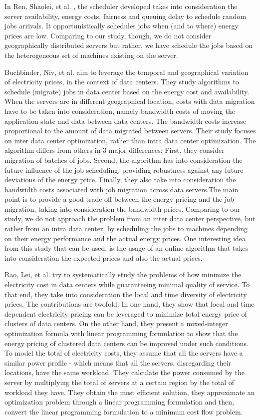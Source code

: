 In Ren, Shaolei, et al. \cite{EFF_JOB_SCHEDULING}, the scheduler developed takes into consideration
the server availability, energy costs, fairness and queuing delay to schedule
random jobs arrivals. It opportunistically schedules jobs when (and to where) 
energy prices are low. Comparing to our study, though, we do not consider geographically distributed 
servers but rather, we have schedule the jobs based on the heterogeneous set of 
machines existing on the server.


Buchbinder, Niv, et al. \cite{MIGRATION_CLOUD} aim to leverage the temporal and geographical variation of
electricity prices, in the context of data centers. They study algorithms to
schedule (migrate) jobs in data center based on the energy cost and
availability. When the servers are in different geographical location, costs with data
migration have to be taken into consideration, namely bandwidth costs of moving
the application state and data between data centers. The bandwidth costs
increase proportional to the amount of data migrated between servers. Their study focuses on inter data center optimization, rather than intra data
center optimization. The algorithm differs from others in 3 major differences: First, they consider
migration of batches of jobs. Second, the algorithm has into consideration the
future influence of the job scheduling, providing robustness against any future
deviations of the energy price. Finally, they also take into consideration the 
bandwidth costs associated with job migration across data servers.The main point is to provide a good trade off between the energy pricing and the
job migration, taking into consideration the bandwidth prices. Comparing to our study, we do not approach the problem from an inter data center
perspective, but rather from an intra data center, by scheduling the jobs to
machines depending on their energy performance and the actual energy prices. One
interesting idea from this study that can be used, is the usage of an online
algorithm that takes into consideration the expected prices and also the actual
prices.


Rao, Lei, et al. \cite{MINIMIZING_DIST} try to systematically study the problems of how
minimize the electricity cost in data centers while guaranteeing minimal quality
of service. To that end, they take into consideration the local and time diversity 
of electricity prices. The contributions are twofold: In one hand, they show that local and time
dependent electricity pricing can be leveraged to minimize total energy price
of clusters of data centers. On the other hand, they present a mixed-integer
optimization formula with linear programming formulation to show that the energy
pricing of clustered data centers can be improved under such conditions. To model the total of electricity costs, they assume that all the servers have a
similar power profile - which means that all the servers, disregarding their
locations, have the same workload. They calculate the power consumed by the
server by multiplying the total of servers at a certain region by the total of
workload they have.  They obtain the most efficient solution, they approximate an optimization
problem through a linear programming formulation and then, convert the linear
programming formulation to a minimum cost flow problem. 

